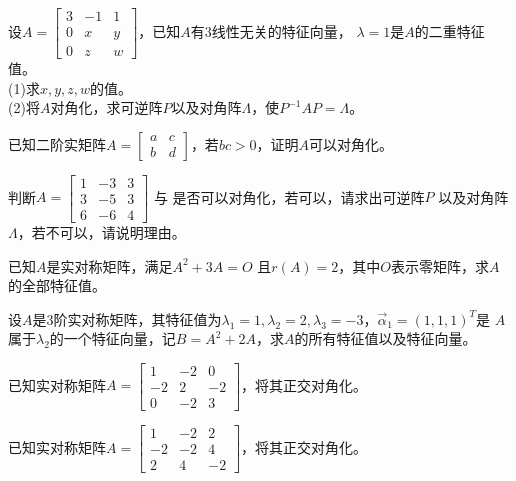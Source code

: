 \begin{ex}\label{7.18}
设$A=\begin{bmatrix}3&-1&1\\0&x&y\\0&z&w\end{bmatrix}$，已知$A$有3线性无关的特征向量，
$\lambda=1$是$A$的二重特征值。\\
(1)求$x,y,z,w$的值。\\
(2)将$A$对角化，求可逆阵$P$以及对角阵$\Lambda$，使$P^{-1}AP=\Lambda$。
\end{ex}

\begin{ex}\label{7.19}
已知二阶实矩阵$A=\begin{bmatrix}a&c\\b&d\end{bmatrix}$，若$bc>0$，证明$A$可以对角化。
\end{ex}

\begin{ex}\label{7.20}
判断$A=\begin{bmatrix}1&-3&3\\3&-5&3\\6&-6&4\end{bmatrix}$ 与
是否可以对角化，若可以，请求出可逆阵$P$ 以及对角阵$\Lambda$，若不可以，请说明理由。
\end{ex}

\begin{ex}\label{7.21}
已知$A$是实对称矩阵，满足$A^2+3A=O$ 且$r(A)=2$，其中$O$表示零矩阵，求$A$的全部特征值。
\end{ex}

\begin{ex}\label{7.22}
设$A$是3阶实对称矩阵，其特征值为$\lambda_1=1,\lambda_2=2,\lambda_3=-3$，$\vec{\alpha}_1=(1,1,1)^T$是
$A$属于$\lambda_2$的一个特征向量，记$B=A^2+2A$，求$A$的所有特征值以及特征向量。
\end{ex}

\begin{ex}\label{7.23}
已知实对称矩阵$A=\begin{bmatrix}1&-2&0\\-2&2&-2\\0&-2&3\end{bmatrix}$，将其正交对角化。
\end{ex}

\begin{ex}\label{7.24}
已知实对称矩阵$A=\begin{bmatrix}1&-2&2\\-2&-2&4\\2&4&-2\end{bmatrix}$，将其正交对角化。
\end{ex}

